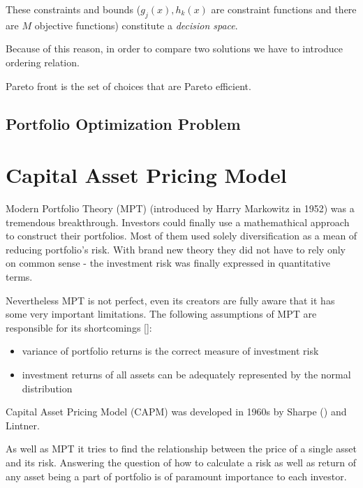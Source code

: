These constraints and bounds ($g_{j}(x) , h_{k}(x) $ are constraint functions and there are $M$ objective functions) constitute a \emph{decision space}. 
\cite{Deb:2001:MOU:559152}




Because of this reason, in order to compare two solutions we have to introduce ordering relation.

Pareto front is the set of choices that are Pareto efficient. 

\subsection{Portfolio Optimization Problem}


\section{Capital Asset Pricing Model}
\label{CAPM}


Modern Portfolio Theory (MPT) (introduced by Harry Markowitz in 1952) was a tremendous breakthrough. 
Investors could finally use a mathemathical approach to construct their portfolios.
Most of them used solely diversification as a mean of reducing portfolio's risk.
With brand new theory they did not have to rely only on common sense - the investment risk was finally expressed in quantitative terms. 

Nevertheless MPT is not perfect, even its creators are fully aware that it has some very important limitations.
The following assumptions of MPT are responsible for its shortcomings [\cite{MPT}]:
\begin{itemize}
  \item variance of portfolio returns is the correct measure of investment risk
  \item investment returns of all assets can be adequately represented by the normal distribution
\end{itemize}

  

Capital Asset Pricing Model (CAPM) was developed in 1960s by Sharpe (\cite{CAPM-Sharpe}) and Lintner.
 
As well as MPT it tries to find the relationship between the price of a single asset and its risk.
Answering the question of how to calculate a risk as well as return of any asset being a part of portfolio is of paramount importance to each investor.

